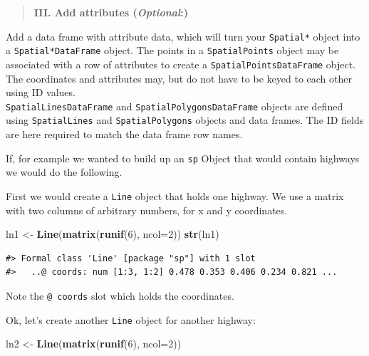 \documentclass[]{book}
\newenvironment{Shaded}{\begin{snugshade}}{\end{snugshade}}
\newcommand{\KeywordTok}[1]{\textcolor[rgb]{0.13,0.29,0.53}{\textbf{#1}}}
\newcommand{\DataTypeTok}[1]{\textcolor[rgb]{0.13,0.29,0.53}{#1}}
\newcommand{\DecValTok}[1]{\textcolor[rgb]{0.00,0.00,0.81}{#1}}
\newcommand{\StringTok}[1]{\textcolor[rgb]{0.31,0.60,0.02}{#1}}
\newcommand{\NormalTok}[1]{#1}
\begin{document}
\begin{quote}
\textbf{III. Add attributes (\emph{Optional}:)}
\end{quote}

Add a data frame with attribute data, which will turn your
\texttt{Spatial*} object into a \texttt{Spatial*DataFrame} object. The
points in a \texttt{SpatialPoints} object may be associated with a row
of attributes to create a \texttt{SpatialPointsDataFrame} object. The
coordinates and attributes may, but do not have to be keyed to each
other using ID values.\\
\texttt{SpatialLinesDataFrame} and \texttt{SpatialPolygonsDataFrame}
objects are defined using \texttt{SpatialLines} and
\texttt{SpatialPolygons} objects and data frames. The ID fields are here
required to match the data frame row names.

If, for example we wanted to build up an \texttt{sp} Object that would
contain highways we would do the following.

First we would create a \texttt{Line} object that holds one highway. We
use a matrix with two columns of arbitrary numbers, for x and y
coordinates.

\begin{Shaded}
\begin{Highlighting}[]
\NormalTok{ln1 <-}\StringTok{ }\KeywordTok{Line}\NormalTok{(}\KeywordTok{matrix}\NormalTok{(}\KeywordTok{runif}\NormalTok{(}\DecValTok{6}\NormalTok{), }\DataTypeTok{ncol=}\DecValTok{2}\NormalTok{))}
\KeywordTok{str}\NormalTok{(ln1)}
\end{Highlighting}
\end{Shaded}

\begin{verbatim}
#> Formal class 'Line' [package "sp"] with 1 slot
#>   ..@ coords: num [1:3, 1:2] 0.478 0.353 0.406 0.234 0.821 ...
\end{verbatim}

Note the \texttt{@\ coords} slot which holds the coordinates.

Ok, let's create another \texttt{Line} object for another highway:

\begin{Shaded}
\begin{Highlighting}[]
\NormalTok{ln2 <-}\StringTok{ }\KeywordTok{Line}\NormalTok{(}\KeywordTok{matrix}\NormalTok{(}\KeywordTok{runif}\NormalTok{(}\DecValTok{6}\NormalTok{), }\DataTypeTok{ncol=}\DecValTok{2}\NormalTok{))}
\end{Highlighting}
\end{Shaded}
\end{document}
